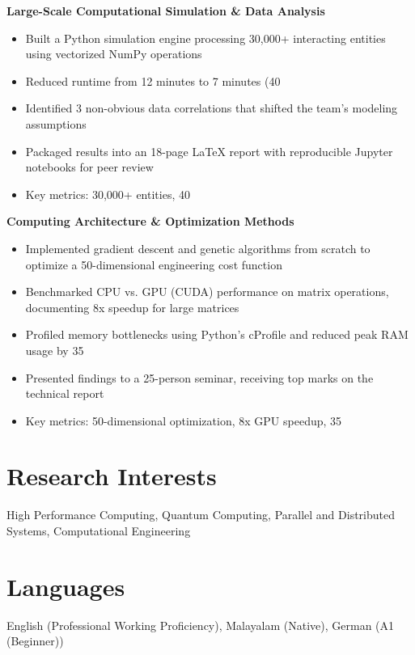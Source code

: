 \documentclass[11pt,a4paper]{article}
\begin{document}
\textbf{ Large-Scale Computational Simulation & Data Analysis }
\begin{itemize}[leftmargin=*,nosep,topsep=2pt]
    
    \item Built a Python simulation engine processing 30,000+ interacting entities using vectorized NumPy operations
    
    \item Reduced runtime from 12 minutes to 7 minutes (40%
    
    \item Identified 3 non-obvious data correlations that shifted the team's modeling assumptions
    
    \item Packaged results into an 18-page LaTeX report with reproducible Jupyter notebooks for peer review
    
    \item Key metrics: 30,000+ entities, 40%
    
\end{itemize}

\textbf{ Computing Architecture & Optimization Methods }
\begin{itemize}[leftmargin=*,nosep,topsep=2pt]
    
    \item Implemented gradient descent and genetic algorithms from scratch to optimize a 50-dimensional engineering cost function
    
    \item Benchmarked CPU vs. GPU (CUDA) performance on matrix operations, documenting 8x speedup for large matrices
    
    \item Profiled memory bottlenecks using Python's cProfile and reduced peak RAM usage by 35%
    
    \item Presented findings to a 25-person seminar, receiving top marks on the technical report
    
    \item Key metrics: 50-dimensional optimization, 8x GPU speedup, 35%
    
\end{itemize}


\section{Research Interests}
High Performance Computing, Quantum Computing, Parallel and Distributed Systems, Computational Engineering

\section{Languages}
English (Professional Working Proficiency), Malayalam (Native), German (A1 (Beginner))
\end{document}
